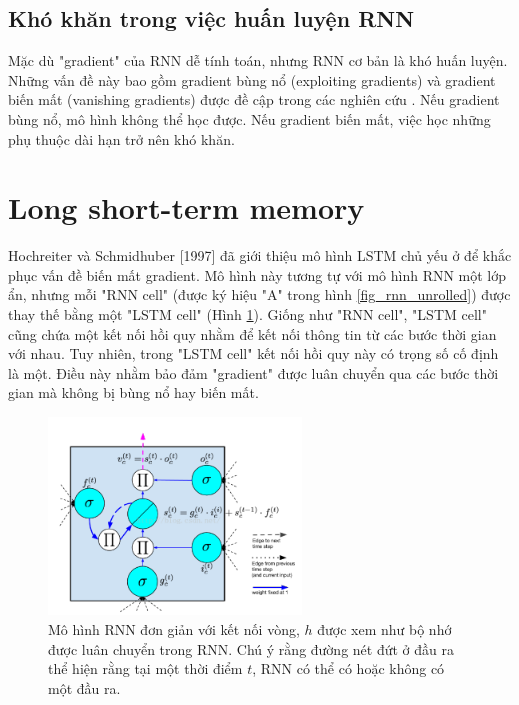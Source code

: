 \subsection{Khó khăn trong việc huấn luyện RNN}

Mặc dù "gradient" của RNN dễ tính toán, nhưng RNN cơ bản là khó huấn luyện. Những vấn đề này bao gồm gradient bùng nổ (exploiting gradients) và gradient biến mất (vanishing gradients) được đề cập trong các nghiên cứu \cite{pascanu2011} \cite{hochreiter1997}. Nếu gradient bùng nổ, mô hình không thể học được. Nếu gradient biến mất, việc học những phụ thuộc dài hạn trở nên khó khăn.

\section{Long short-term memory}

Hochreiter và Schmidhuber [1997] đã giới thiệu mô hình LSTM chủ yếu ở để khắc phục vấn đề biến mất gradient. Mô hình này tương tự với mô hình RNN một lớp ẩn, nhưng mỗi "RNN cell" (được ký hiệu "A" trong hình \ref{fig_rnn_unrolled}) được thay thế bằng một "LSTM cell" (Hình \ref{fig_lstmCell}). Giống như "RNN cell", "LSTM cell" cũng chứa một kết nối hồi quy nhằm để kết nối thông tin từ các bước thời gian với nhau. Tuy nhiên, trong "LSTM cell" kết nối hồi quy này có trọng số cố định là một. Điều này nhằm bảo đảm "gradient" được luân chuyển qua các bước thời gian mà không bị bùng nổ hay biến mất.

\begin{figure}
	\centering
	\includegraphics[width=0.6\textwidth]{lstmCell}
	\caption[Một "LSTM cell"]{Mô hình RNN đơn giản với kết nối vòng, \textbf{$h$} được xem như bộ nhớ được luân chuyển trong RNN. Chú ý rằng đường nét đứt ở đầu ra thể hiện rằng tại một thời điểm $t$, RNN có thể có hoặc không có một đầu ra.}
	\label{fig_lstmCell}
\end{figure}

